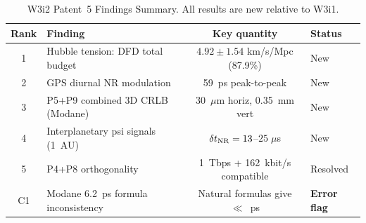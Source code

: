 \documentclass[aps,prd,twocolumn,superscriptaddress,nofootinbib,longbibliography]{revtex4-2}
\begin{document}
\begin{table}[t]
\caption{W3i2 Patent~5 Findings Summary.  All results are new relative to W3i1.}
\begin{ruledtabular}
\begin{tabular}{clcl}
Rank & Finding & Key quantity & Status \\
\hline
1 & Hubble tension: DFD total budget & $4.92\pm1.54$ km/s/Mpc (87.9\%) & New \\
2 & GPS diurnal NR modulation & 59~ps peak-to-peak & New \\
3 & P5+P9 combined 3D CRLB (Modane) & 30~$\mu$m horiz, 0.35~mm vert & New \\
4 & Interplanetary psi signals (1~AU) & $\delta t_{\rm NR} = 13$--$25\;\mu$s & New \\
5 & P4+P8 orthogonality & 1~Tbps + 162~kbit/s compatible & Resolved \\
\hline
C1 & Modane 6.2~ps formula inconsistency & Natural formulas give $\ll$~ps & \textbf{Error flag} \\
\end{tabular}
\end{ruledtabular}
\end{table}
\end{document}
